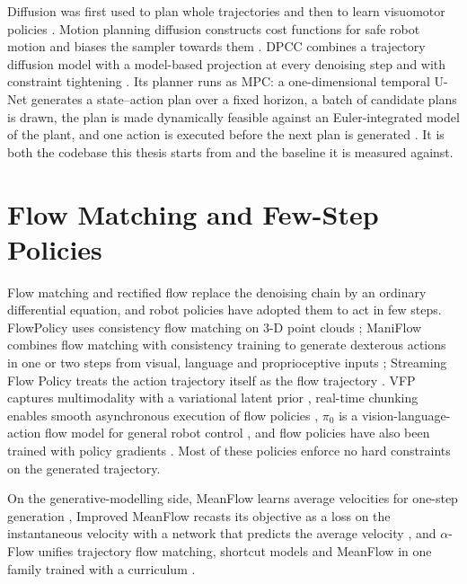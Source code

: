 \documentclass[headsepline,footsepline,footinclude=false,oneside,fontsize=11pt,paper=a4,listof=totoc,bibliography=totoc]{scrbook}
\theoremstyle{definition}
\theoremstyle{plain}
\theoremstyle{remark}
\begin{document}
Diffusion was first used to plan whole trajectories \parencite{janner2022planning} and then to learn
visuomotor policies \parencite{chi2023diffusion}. Motion planning diffusion constructs cost functions
for safe robot motion and biases the sampler towards them \parencite{carvalho2025motion}. \ac{DPCC}
combines a trajectory diffusion model with a model-based projection at every denoising step and with
constraint tightening \parencite{romer2025diffusion}. Its planner runs as \ac{MPC}: a one-dimensional
temporal U-Net generates a state--action plan over a fixed horizon, a batch of candidate plans is
drawn, the plan is made dynamically feasible against an Euler-integrated model of the plant, and one
action is executed before the next plan is generated \parencite[Sec.~5]{romer2025diffusion}. It is
both the codebase this thesis starts from and the baseline it is measured against.

\section{Flow Matching and Few-Step Policies}\label{sec:rel:fm}

Flow matching \parencite{lipman2023flow,lipman2024guide} and rectified flow \parencite{liu2023flow}
replace the denoising chain by an ordinary differential equation, and robot policies have adopted them
to act in few steps. FlowPolicy uses consistency flow matching on 3-D point clouds
\parencite{zhang2024flowpolicy}; ManiFlow combines flow matching with consistency training to generate
dexterous actions in one or two steps from visual, language and proprioceptive inputs
\parencite{yan2025maniflow}; Streaming Flow Policy treats the action trajectory itself as the flow
trajectory \parencite{jiang2025streaming}. VFP captures multimodality with a variational latent prior
\parencite{zhai2025vfp}, real-time chunking enables smooth asynchronous execution of flow policies
\parencite{black2025rtc}, $\pi_0$ is a vision-language-action flow model for general robot control
\parencite{black2024pi0}, and flow policies have also been trained with policy gradients
\parencite{yi2026fpg}. Most of these policies enforce no hard constraints on the generated
trajectory.

On the generative-modelling side, MeanFlow learns average velocities for one-step generation
\parencite{geng2025meanflow}, Improved MeanFlow recasts its objective as a loss on the instantaneous
velocity with a network that predicts the average velocity \parencite{geng2025imf}, and $\alpha$-Flow
unifies trajectory flow matching, shortcut models and MeanFlow in one family trained with a curriculum
\parencite{zhang2025alphaflow}.
\end{document}
